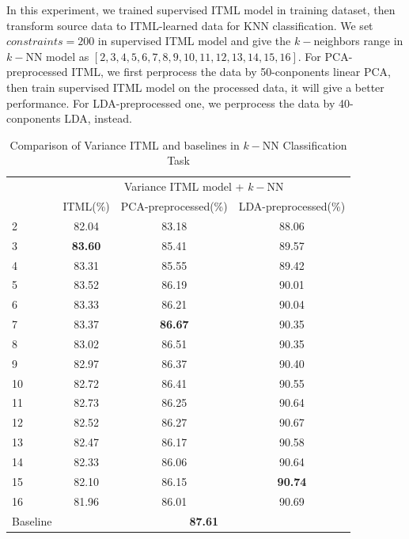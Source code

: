 \documentclass[conference]{IEEEtran}
\begin{document}
In this experiment, we trained supervised ITML model in training dataset, then transform source data to ITML-learned data for KNN classification. We set $constraints=200$ in supervised ITML model and give the $k-$neighbors range in $k-$NN model as $[2, 3, 4, 5, 6, 7, 8, 9, 10, 11, 12, 13, 14, 15, 16]$. For PCA-preprocessed ITML, we first perprocess the data by 50-conponents linear PCA, then train supervised ITML model on the processed data, it will give a better performance. For LDA-preprocessed one, we perprocess the data by 40-conponents LDA, instead.

\begin{table}[htbp]
	\centering
 	\newcommand{\tabincell}[2]{\begin{tabular}{@{}#1@{}}#2\end{tabular}}
 	\renewcommand\arraystretch{1.0}
 	\caption{Comparison of Variance ITML and baselines in $k-$NN Classification Task}
 	\label{base2}%
 		\begin{tabular}{@{}p{1cm}<{\centering}|c|c|c}
 		\hline
 		\multirow{2}{*}{\diagbox[height=2\line,width=1.42cm,font=\tiny]{$k$}{Acc.}{$\mathit{M}$}} &
 		\multicolumn{3}{c}{Variance ITML model + $k-$NN}\\
 		\cline{2-4}
 		& {ITML(\%)} & {PCA-preprocessed(\%)} & {LDA-preprocessed(\%)}\\
 		\hline
 		2   & 82.04 & 83.18 & 88.06\\
 		3   & \textbf{83.60} & 85.41 & 89.57\\
 		4   & 83.31 & 85.55 & 89.42\\
 		5   & 83.52  & 86.19 & 90.01\\
 		6   & 83.33  & 86.21 & 90.04\\
 		7   & 83.37  & \textbf{86.67} & 90.35\\
 		8   & 83.02  & 86.51 & 90.35\\
 		9   & 82.97  & 86.37 & 90.40\\
 		10   & 82.72  & 86.41 & 90.55\\
 		11   & 82.73  & 86.25 & 90.64\\
 		12   & 82.52  & 86.27 & 90.67\\
 		13   & 82.47  & 86.17 & 90.58\\
 		14   & 82.33  & 86.06 & 90.64\\
 		15   & 82.10  & 86.15 & \textbf{90.74}\\
		16   & 81.96  & 86.01 & 90.69\\
		\hline
 		Baseline & \multicolumn{3}{c}{\textbf{87.61}} \\
 		\hline
 	\end{tabular}
\end{table}
\end{document}
